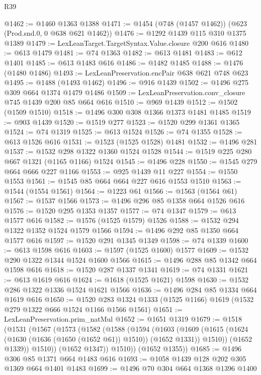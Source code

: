 \begin{lexlean}{R39}
\begin{coremodule}
@1462 := @1460 @1363 @1388
@1471 := @1454 (@748 (@1457 @1462)) (@623 (Prod.snd.{0, 0} @638 @621 @1462))
@1476 := @1292 @1439 @115 @310 @1375 @1389
@1479 := LexLeanTarget.TargetSyntax.Value.closure @200 @616
@1480 := @613 @1479
@1481 := @74 @1363
@1482 := @613 @1481
@1483 := @612 @1401
@1485 := @613 @1483 @616
@1486 := @1482 @1485
@1488 := @1476 (@1480 @1486)
@1493 := LexLeanPreservation.encPair @638 @621 @748 @623
@1495 := @1488 (@1493 @1462)
@1496 := @916 @1439
@1502 := @1496 @275 @309 @664 @1374 @1479 @1486
@1509 := LexLeanPreservation.conv_closure @745 @1439 @200 @85 @664 @616
@1510 := @969 @1439
@1512 := @1502 (@1509 @1510)
@1518 := @1496 @300 @308 @1366 @1373 @1481 @1485
@1519 := @903 @1439
@1520 := @1519 @277
@1523 := @1520 @299 @1361 @1365
@1524 := @74 @1319
@1525 := @613 @1524
@1526 := @74 @1355
@1528 := @613 @1526 @616
@1531 := @1523 (@1525 @1528) @1481
@1532 := @1496 @281
@1537 := @1532 @298 @1322 @1360 @1524 @1528
@1544 := @1519 @225 @280 @667 @1321 (@1165 @1166) @1524
@1545 := @1496 @228
@1550 := @1545 @279 @664 @666 @227 @1166
@1553 := @925 @1439 @11 @227
@1554 := @1550 @1553
@1561 := @1545 @85 @664 @664 @227 @616 @1553 @1510
@1563 := @1544 (@1554 @1561)
@1564 := @1223 @61
@1566 := @1563 (@1564 @61)
@1567 := @1537 @1566
@1573 := @1496 @296 @85 @1358 @664 @1526 @616
@1576 := @1520 @295 @1353 @1357
@1577 := @74 @1347
@1579 := @613 @1577 @616
@1582 := @1576 (@1525 @1579) @1526
@1588 := @1532 @294 @1322 @1352 @1524 @1579 @1566
@1594 := @1496 @292 @85 @1350 @664 @1577 @616
@1597 := @1520 @291 @1345 @1349
@1598 := @74 @1339
@1600 := @613 @1598 @616
@1603 := @1597 (@1525 @1600) @1577
@1609 := @1532 @290 @1322 @1344 @1524 @1600 @1566
@1615 := @1496 @288 @85 @1342 @664 @1598 @616
@1618 := @1520 @287 @1337 @1341
@1619 := @74 @1331
@1621 := @613 @1619 @616
@1624 := @1618 (@1525 @1621) @1598
@1630 := @1532 @286 @1322 @1336 @1524 @1621 @1566
@1636 := @1496 @284 @85 @1334 @664 @1619 @616
@1650 := @1520 @283 @1324 @1333 (@1525 @1166) @1619 (@1532 @279 @1322 @666 @1524 @1166 @1566 @1561)
@1651 := LexLeanPreservation.prim_natMul
@1652 := @1651 @1319
@1679 := @1518
    (@1531
      (@1567
        (@1573
          (@1582
            (@1588
              (@1594
                (@1603
                  (@1609
                    (@1615 (@1624 (@1630 (@1636 (@1650 (@1652 @61)) @1510)) (@1652 @1331)) @1510))
                  (@1652 @1339))
                @1510))
            (@1652 @1347))
          @1510))
      (@1652 @1355))
@1685 := @1496 @306 @85 @1371 @664 @1483 @616
@1693 := @1058 @1439 @128 @202 @305 @1369 @664 @1401 @1483
@1699 := @1496 @70 @304 @664 @1368 @1396 @1400

\end{coremodule}
\end{lexlean}

